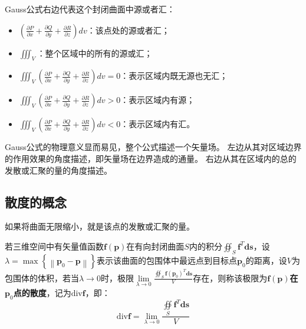 Gauss公式右边代表这个封闭曲面中源或者汇：
\begin{itemize}
    \item $\left( \frac{\partial P}{\partial x}+\frac{\partial Q}{\partial y}+\frac{\partial R}{\partial z} \right) dv$：该点处的源或者汇；
    \item $\iiint_V$：整个区域中的所有的源或汇；
    \item $\iiint_V{\left( \frac{\partial P}{\partial x}+\frac{\partial Q}{\partial y}+\frac{\partial R}{\partial z} \right) dv}=0$：表示区域内既无源也无汇；
    \item $\iiint_V{\left( \frac{\partial P}{\partial x}+\frac{\partial Q}{\partial y}+\frac{\partial R}{\partial z} \right) dv}>0$：表示区域内有源；
    \item $\iiint_V{\left( \frac{\partial P}{\partial x}+\frac{\partial Q}{\partial y}+\frac{\partial R}{\partial z} \right) dv}<0$：表示区域内有汇。
\end{itemize}

\begin{tcolorbox}
Gauss公式的物理意义显而易见，整个公式描述一个矢量场。
左边从其对区域边界的作用效果的角度描述，即矢量场在边界造成的通量。
右边从其在区域内的总的发散或汇聚的量的角度描述。
\end{tcolorbox}

\subsection{散度的概念}

如果将曲面无限缩小，就是该点的发散或汇聚的量。

\begin{definition}[散度]
若三维空间中有矢量值函数$\boldsymbol{f}\left( \boldsymbol{p} \right) $在有向封闭曲面$S$内的积分$\oiint_S{\boldsymbol{f}^T\boldsymbol{ds}}$，设$\lambda =\max \left\{ \left\| \boldsymbol{p}_0-\boldsymbol{p} \right\| \right\} $表示该曲面的包围体中最远点到目标点$\boldsymbol{p}_0$的距离，设$V$为包围体的体积，若当$\lambda \rightarrow 0$时，极限$\underset{\lambda \rightarrow 0}{\lim}\frac{\oiint_S{\boldsymbol{f}\left( \boldsymbol{p}_0 \right) ^T\boldsymbol{ds}}}{V}$存在，则称该极限为{\bf $\boldsymbol{f}\left( \boldsymbol{p} \right) $在$\boldsymbol{p}_0$点的散度}，记为$\mathrm{div}\boldsymbol{f}$，即：
\[
\mathrm{div}\boldsymbol{f}=\underset{\lambda \rightarrow 0}{\lim}\frac{\oiint\limits_S{\boldsymbol{f}^T\boldsymbol{ds}}}{V}
\]
\end{definition}

